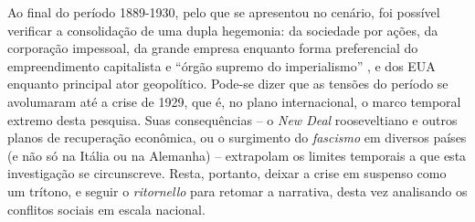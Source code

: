 Ao final do período 1889-1930, pelo que se apresentou no cenário, foi possível verificar a consolidação de uma dupla hegemonia: da sociedade por ações, da corporação impessoal, da grande empresa enquanto forma preferencial do empreendimento capitalista e ``órgão supremo do imperialismo'' \cite{PEDROSA1966a}, e dos EUA enquanto principal ator geopolítico. Pode-se dizer que as tensões do período se avolumaram até a crise de 1929, que é, no plano internacional, o marco temporal extremo desta pesquisa. Suas consequências -- o \textit{New Deal} rooseveltiano e outros planos de recuperação econômica, ou o surgimento do \textit{fascismo} em diversos países (e não só na Itália ou na Alemanha) -- extrapolam os limites temporais a que esta investigação se circunscreve. Resta, portanto, deixar a crise em suspenso como um trítono, e seguir o \textit{ritornello} para retomar a narrativa, desta vez analisando os conflitos sociais em escala nacional.